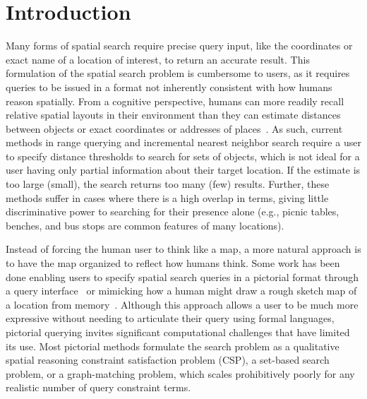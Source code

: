 \section{Introduction}
\label{section:introduction}
\par{Many forms of spatial search require precise query input, like the coordinates or exact name of a location of interest, to return an accurate result. 
This formulation of the spatial search problem is cumbersome to users, as it requires queries to be issued in a format not inherently consistent with how humans reason spatially.
From a cognitive perspective, humans can more readily recall relative spatial layouts in their environment than they can estimate distances between objects or exact coordinates or addresses of places~\cite{Schwering2014, Weisberg2016, Miller2013, Keatley2021}.
As such, current methods in range querying and incremental nearest neighbor search require a user to specify distance thresholds to search for sets of objects, which is not ideal for a user having only partial information about their target location.
If the estimate is too large (small), the search returns too many (few) results. 
Further, these methods suffer in cases where there is a high overlap in terms, giving little discriminative power to searching for their presence alone (e.g., picnic tables, benches, and bus stops are common features of many locations). 
}
%
\par{Instead of forcing the human user to think like a map, a more natural approach is to have the map organized to reflect how humans think. 
Some work has been done enabling users to specify spatial search queries in a pictorial format through a query interface~\cite{Soffer1997,DiLoreto1996} or mimicking how a human might draw a rough sketch map of a location from memory~\cite{Schwering2014}.
Although this approach allows a user to be much more expressive without needing to articulate their query using formal languages, pictorial querying invites significant computational challenges that have limited its use. 
Most pictorial methods formulate the search problem as a qualitative spatial reasoning constraint satisfaction problem (CSP), a set-based search problem, or a graph-matching problem, which scales prohibitively poorly for any realistic number of query constraint terms.
}

